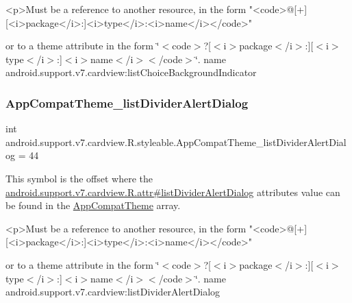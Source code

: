 \begin{DoxyVerb}      <p>Must be a reference to another resource, in the form "<code>@[+][<i>package</i>:]<i>type</i>:<i>name</i></code>"
\end{DoxyVerb}
 or to a theme attribute in the form \char`\"{}$<$code$>$?\mbox{[}$<$i$>$package$<$/i$>$\+:\mbox{]}\mbox{[}$<$i$>$type$<$/i$>$\+:\mbox{]}$<$i$>$name$<$/i$>$$<$/code$>$\char`\"{}.  name android.\+support.\+v7.\+cardview\+:list\+Choice\+Background\+Indicator \mbox{\label{classandroid_1_1support_1_1v7_1_1cardview_1_1R_1_1styleable_a3b67d0da8fefb257707bd3d70e79ba96}} 
\subsubsection{\texorpdfstring{App\+Compat\+Theme\+\_\+list\+Divider\+Alert\+Dialog}{AppCompatTheme\_listDividerAlertDialog}}
{\footnotesize\ttfamily int android.\+support.\+v7.\+cardview.\+R.\+styleable.\+App\+Compat\+Theme\+\_\+list\+Divider\+Alert\+Dialog = 44\hspace{0.3cm}{\ttfamily [static]}}

This symbol is the offset where the \hyperlink{classandroid_1_1support_1_1v7_1_1cardview_1_1R_1_1attr_a2782cc47afc140978337e9de1c8f70ec}{android.\+support.\+v7.\+cardview.\+R.\+attr\#list\+Divider\+Alert\+Dialog} attribute\textquotesingle{}s value can be found in the \hyperlink{classandroid_1_1support_1_1v7_1_1cardview_1_1R_1_1styleable_a52e6f69f954ecc2622d72c0b4d298938}{App\+Compat\+Theme} array.

\begin{DoxyVerb}      <p>Must be a reference to another resource, in the form "<code>@[+][<i>package</i>:]<i>type</i>:<i>name</i></code>"
\end{DoxyVerb}
 or to a theme attribute in the form \char`\"{}$<$code$>$?\mbox{[}$<$i$>$package$<$/i$>$\+:\mbox{]}\mbox{[}$<$i$>$type$<$/i$>$\+:\mbox{]}$<$i$>$name$<$/i$>$$<$/code$>$\char`\"{}.  name android.\+support.\+v7.\+cardview\+:list\+Divider\+Alert\+Dialog \mbox{\label{classandroid_1_1support_1_1v7_1_1cardview_1_1R_1_1styleable_a8c1f6899fdf824c15d7b6e5fb01901a3}} 
